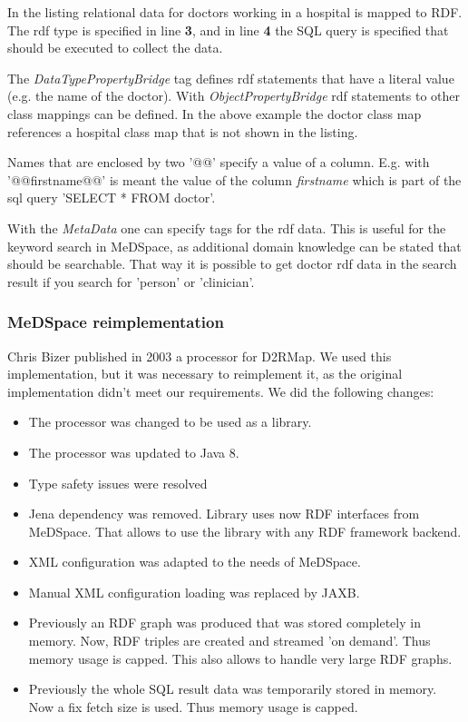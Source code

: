 In the listing relational data for doctors working in a hospital is mapped to RDF. The rdf type is specified in line \textbf{3}, and in line \textbf{4} the SQL query is specified that should be executed to collect the data. 

The \emph{DataTypePropertyBridge} tag defines rdf statements that have a literal value (e.g. the name of the doctor). 
With \emph{ObjectPropertyBridge} rdf statements to other class mappings can be defined. In the above example the doctor class map references a hospital class map that is not shown in the listing. 

Names that are enclosed by two '@@' specify a value of a column. E.g. with '@@firstname@@' is meant the value of the column \emph{firstname} which is part of the sql query 'SELECT * FROM doctor'.

With the \emph{MetaData} one can specify tags for the rdf data. This is useful for the keyword search in MeDSpace, as additional domain knowledge can be stated that should be searchable. That way it is possible to get doctor rdf data in the search result if you search for 'person' or 'clinician'. 

\subsubsection{MeDSpace reimplementation} 

Chris Bizer published in 2003 a processor for D2RMap. We used this implementation, but it was necessary to reimplement it, as the original implementation didn't meet our requirements. We did the following changes:

\begin{itemize}
\item The processor was changed to be used as a library.
\item The processor was updated to Java 8.
\item Type safety issues were resolved
\item Jena dependency was removed.  Library uses now RDF interfaces from MeDSpace. That allows to use the library with any RDF framework backend.
\item XML configuration was adapted to the needs of MeDSpace.
\item Manual XML configuration loading was replaced by JAXB.
\item Previously an RDF graph was produced that was stored completely in memory. Now, RDF triples are created and streamed 'on demand'. Thus memory usage is capped. This also allows to handle very large RDF graphs. 
\item Previously the whole SQL result data was temporarily stored in memory. Now a fix fetch size is used. Thus memory usage is capped.
\end{itemize}  


